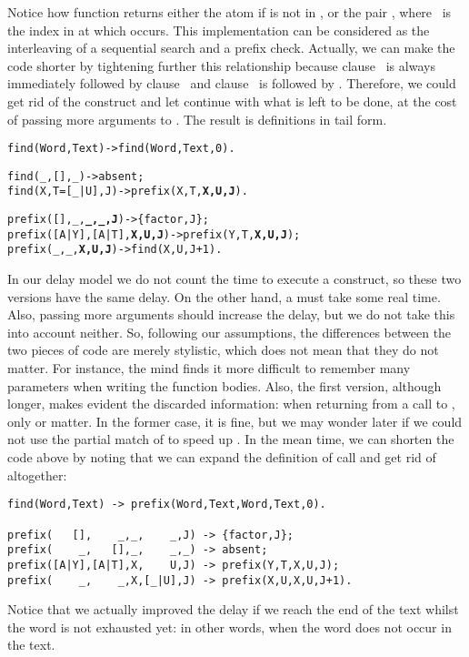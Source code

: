 Notice how function  returns either the atom
 if  is not in , or the
pair , where ~is the index in
 at which  occurs. This implementation can
be considered as the interleaving of a sequential search and a prefix
check. Actually, we can make the code shorter by tightening further
this relationship because clause~\clause{\zeta} is always immediately
followed by clause~\clause{\delta} and clause~\clause{\theta} is
followed by \clause{\epsilon}. Therefore, we could get rid of the
 construct and let  continue with what
is left to be done, at the cost of passing more arguments to
. The result is definitions in tail form.
\begin{alltt}
find(Word,Text) -> find(Word,Text,0).\hfill% \emph{First index is 0}

find(_,     [],_) -> absent;\hfill% \emph{Failure}
find(X,T=[_|U],J) -> prefix(X,T,\textbf{X,U,J}).

prefix(   [],    _,\textbf{_,_,J}) -> \{factor,J\};\hfill% \emph{Success}
prefix([A|Y],[A|T],\textbf{X,U,J}) -> prefix(Y,T,\textbf{X,U,J});\hfill% \emph{Match}
prefix(    _,    _,\textbf{X,U,J}) -> find(X,U,J+1).\hfill% \emph{Sliding}
\end{alltt}
In our delay model we do not count the time to execute a
 construct, so these two versions have the same
delay. On the other hand, a  must take some real
time. Also, passing more arguments should increase the delay, but we
do not take this into account neither. So, following our assumptions,
the differences between the two pieces of code are merely stylistic,
which does not mean that they do not matter. For instance, the mind
finds it more difficult to remember many parameters when writing the
function bodies. Also, the first version, although longer, makes
evident the discarded information: when returning from a call to
, only  or  matter. In the
former case, it is fine, but we may wonder later if we could not use
the partial match of  to speed up
. In the mean time, we can shorten the code above by
noting that we can expand the definition of  call
 and get rid of  altogether:
\begin{verbatim}
find(Word,Text) -> prefix(Word,Text,Word,Text,0).

prefix(   [],    _,_,    _,J) -> {factor,J};
prefix(    _,   [],_,    _,_) -> absent;
prefix([A|Y],[A|T],X,    U,J) -> prefix(Y,T,X,U,J);
prefix(    _,    _,X,[_|U],J) -> prefix(X,U,X,U,J+1).
\end{verbatim}
Notice that we actually improved the delay if we reach the end of the
text whilst the word is not exhausted yet: in other words, when the
word does not occur in the text.

